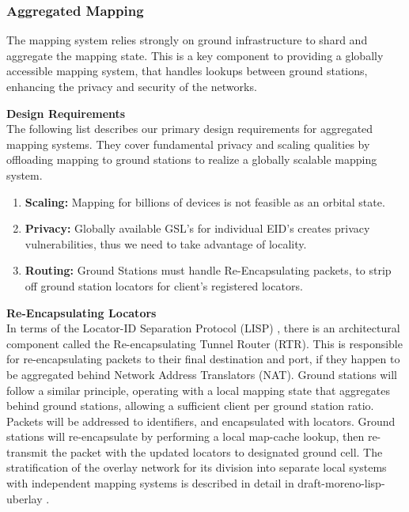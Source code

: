 \documentclass[11pt]{article}
\begin{document}
\subsubsection{Aggregated Mapping}
\label{aggregated-mapping}

\noindent The mapping system relies strongly on ground infrastructure to shard and aggregate the mapping state.
This is a key component to providing a globally accessible mapping system, that handles lookups between ground stations, enhancing the privacy and security of the networks.

\bigskip
{\noindent\textbf{Design Requirements}} \\

\noindent The following list describes our primary design requirements for aggregated mapping systems.
They cover fundamental privacy and scaling qualities by offloading mapping to ground stations to realize a globally scalable mapping system.

\begin{enumerate}
    \item \textbf{Scaling:} Mapping for billions of devices is not feasible as an orbital state.
    \item \textbf{Privacy:} Globally available GSL's for individual EID's creates privacy vulnerabilities, thus we need to take advantage of locality.
    \item \textbf{Routing:} Ground Stations must handle Re-Encapsulating packets, to strip off ground station locators for client's registered locators.
\end{enumerate}

\bigskip
{\noindent\textbf{Re-Encapsulating Locators}} \\

\noindent In terms of the Locator-ID Separation Protocol (LISP) \cite{LISP}, there is an architectural component called the Re-encapsulating Tunnel Router (RTR). 
This is responsible for re-encapsulating packets to their final destination and port, if they happen to be aggregated behind Network Address Translators (NAT).
Ground stations will follow a similar principle, operating with a local mapping state that aggregates behind ground stations, allowing a sufficient client per ground station ratio.
Packets will be addressed to identifiers, and encapsulated with locators.
Ground stations will re-encapsulate by performing a local map-cache lookup, then re-transmit the packet with the updated locators to designated ground cell.
The stratification of the overlay network for its division into separate local systems with independent mapping systems is described in detail in draft-moreno-lisp-uberlay \cite{uberlay}.
\end{document}
